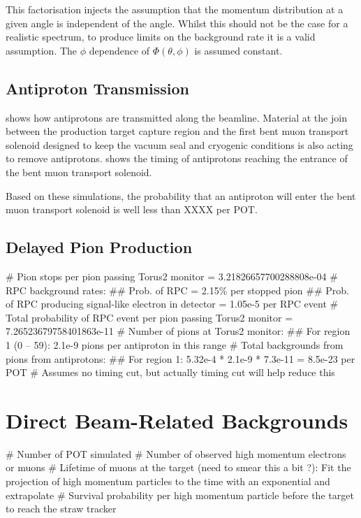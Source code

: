 This factorisation injects the assumption that the momentum distribution at a given angle is independent of the angle.
Whilst this should not be the case for a realistic spectrum, to produce limits on the background rate it is a valid assumption.
The $\phi$ dependence of $\Phi(\theta,\phi)$ is assumed constant.  

\subsection{Antiproton Transmission}
 shows how antiprotons are transmitted along the beamline.
Material at the join between the production target capture region and the first bent muon transport solenoid designed to keep the vacuum seal and cryogenic conditions is also acting to remove antiprotons.
 shows the timing of antiprotons reaching the entrance of the bent muon transport solenoid.

Based on these simulations, the probability that an antiproton will enter the bent muon transport solenoid is well less than XXXX per POT.

\subsection{Delayed Pion Production}

\begin{easylist}
	# Pion stops per pion passing Torus2 monitor = 3.21826657700288808e-04 %
	# RPC background rates:
	## Prob. of RPC = 2.15\% per stopped pion
	## Prob. of RPC producing signal-like electron in detector = 1.05e-5 per RPC event
	# Total probability of RPC event per pion passing Torus2 monitor = 7.26523679758401863e-11
	# Number of pions at Torus2 monitor: 
	## For region 1 (0 -- 59\degree): 2.1e-9 pions per antiproton in this range
	# Total backgrounds from pions from antiprotons:
	## For region 1: 5.32e-4 * 2.1e-9 * 7.3e-11 = 8.5e-23 per POT
	# Assumes no timing cut, but actually timing cut will help reduce this
\end{easylist}

\section{Direct Beam-Related Backgrounds}
\begin{easylist}
	# Number of POT simulated
	# Number of observed high momentum electrons or muons
	# Lifetime of muons at the target (need to smear this a bit ?): Fit the projection of high momentum particles to the time with an exponential and extrapolate
	# Survival probability per high momentum particle before the target to reach the straw tracker
\end{easylist}


